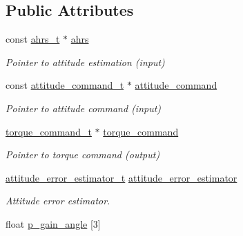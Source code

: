 \subsection*{Public Attributes}
\begin{DoxyCompactItemize}
\item 
\hypertarget{structattitude__controller__p2__t_afb04d52906602036af7ebc27cf35daba}{const \hyperlink{structahrs__t}{ahrs\+\_\+t} $\ast$ \hyperlink{structattitude__controller__p2__t_afb04d52906602036af7ebc27cf35daba}{ahrs}}\label{structattitude__controller__p2__t_afb04d52906602036af7ebc27cf35daba}

\begin{DoxyCompactList}\small\item\em Pointer to attitude estimation (input) \end{DoxyCompactList}\item 
\hypertarget{structattitude__controller__p2__t_ab1b342ff2559c4831e64657ad9c3fce1}{const \hyperlink{structattitude__command__t}{attitude\+\_\+command\+\_\+t} $\ast$ \hyperlink{structattitude__controller__p2__t_ab1b342ff2559c4831e64657ad9c3fce1}{attitude\+\_\+command}}\label{structattitude__controller__p2__t_ab1b342ff2559c4831e64657ad9c3fce1}

\begin{DoxyCompactList}\small\item\em Pointer to attitude command (input) \end{DoxyCompactList}\item 
\hypertarget{structattitude__controller__p2__t_ae13d758cb3d4d484bd495b80b859c52d}{\hyperlink{structtorque__command__t}{torque\+\_\+command\+\_\+t} $\ast$ \hyperlink{structattitude__controller__p2__t_ae13d758cb3d4d484bd495b80b859c52d}{torque\+\_\+command}}\label{structattitude__controller__p2__t_ae13d758cb3d4d484bd495b80b859c52d}

\begin{DoxyCompactList}\small\item\em Pointer to torque command (output) \end{DoxyCompactList}\item 
\hypertarget{structattitude__controller__p2__t_a877e0ef5949a6fb8280d9e6d0a078641}{\hyperlink{structattitude__error__estimator__t}{attitude\+\_\+error\+\_\+estimator\+\_\+t} \hyperlink{structattitude__controller__p2__t_a877e0ef5949a6fb8280d9e6d0a078641}{attitude\+\_\+error\+\_\+estimator}}\label{structattitude__controller__p2__t_a877e0ef5949a6fb8280d9e6d0a078641}

\begin{DoxyCompactList}\small\item\em Attitude error estimator. \end{DoxyCompactList}\item 
\hypertarget{structattitude__controller__p2__t_aaa6d612efcda4bbf9b67a1ae83ee0499}{float \hyperlink{structattitude__controller__p2__t_aaa6d612efcda4bbf9b67a1ae83ee0499}{p\+\_\+gain\+\_\+angle} \mbox{[}3\mbox{]}}\label{structattitude__controller__p2__t_aaa6d612efcda4bbf9b67a1ae83ee0499}


\end{DoxyCompactItemize}
